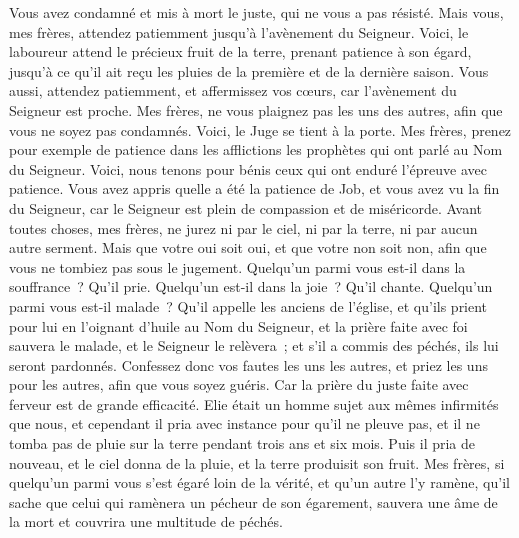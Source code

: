 \begin{multicols}{2}
Vous avez condamné et mis à mort le juste, qui ne vous a pas résisté.
Mais vous, mes frères, attendez patiemment jusqu'à l'avènement du Seigneur. Voici, le laboureur attend le précieux fruit de la terre, prenant patience à son égard, jusqu'à ce qu'il ait reçu les pluies de la première et de la dernière saison.
Vous aussi, attendez patiemment, et affermissez vos cœurs, car l'avènement du Seigneur est proche.
Mes frères, ne vous plaignez pas les uns des autres, afin que vous ne soyez pas condamnés. Voici, le Juge se tient à la porte.
Mes frères, prenez pour exemple de patience dans les afflictions les prophètes qui ont parlé au Nom du Seigneur.
Voici, nous tenons pour bénis ceux qui ont enduré l'épreuve avec patience. Vous avez appris quelle a été la patience de Job, et vous avez vu la fin du Seigneur, car le Seigneur est plein de compassion et de miséricorde.
Avant toutes choses, mes frères, ne jurez ni par le ciel, ni par la terre, ni par aucun autre serment. Mais que votre oui soit oui, et que votre non soit non, afin que vous ne tombiez pas sous le jugement.
Quelqu'un parmi vous est-il dans la souffrance~? Qu'il prie. Quelqu'un est-il dans la joie~? Qu'il chante.
Quelqu'un parmi vous est-il malade~? Qu'il appelle les anciens de l'église, et qu'ils prient pour lui en l'oignant d'huile au Nom du Seigneur,
et la prière faite avec foi sauvera le malade, et le Seigneur le relèvera~; et s'il a commis des péchés, ils lui seront pardonnés.
Confessez donc vos fautes les uns les autres, et priez les uns pour les autres, afin que vous soyez guéris. Car la prière du juste faite avec ferveur est de grande efficacité.
Elie était un homme sujet aux mêmes infirmités que nous, et cependant il pria avec instance pour qu'il ne pleuve pas, et il ne tomba pas de pluie sur la terre pendant trois ans et six mois.
Puis il pria de nouveau, et le ciel donna de la pluie, et la terre produisit son fruit.
Mes frères, si quelqu'un parmi vous s'est égaré loin de la vérité, et qu'un autre l'y ramène,
qu'il sache que celui qui ramènera un pécheur de son égarement, sauvera une âme de la mort et couvrira une multitude de péchés.
\PPE{}
\end{multicols}
